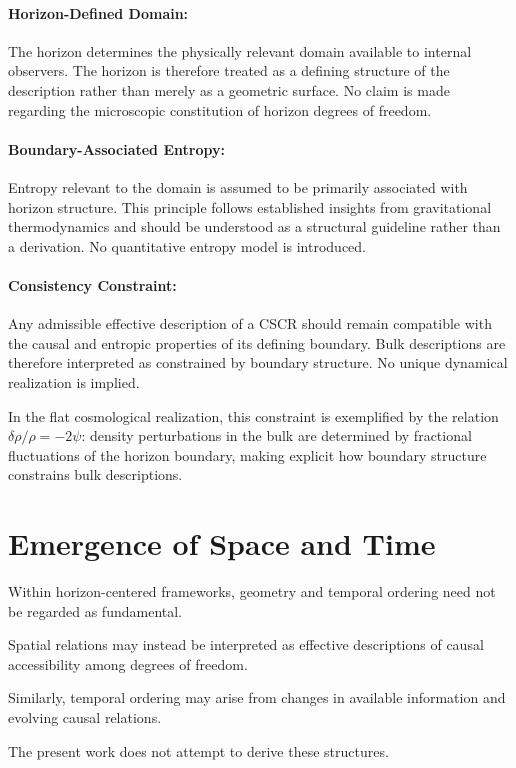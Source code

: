 \documentclass[12pt,a4paper]{article}
\begin{document}
\paragraph{Horizon-Defined Domain:} The horizon determines the physically relevant domain available to internal observers. The horizon is therefore treated as a defining structure of the description rather than merely as a geometric surface. No claim is made regarding the microscopic constitution of horizon degrees of freedom.

\paragraph{Boundary-Associated Entropy:} Entropy relevant to the domain is assumed to be primarily associated with horizon structure. This principle follows established insights from gravitational thermodynamics and should be understood as a structural guideline rather than a derivation. No quantitative entropy model is introduced.

\paragraph{Consistency Constraint:} Any admissible effective description of a CSCR should remain compatible with the causal and entropic properties of its defining boundary. Bulk descriptions are therefore interpreted as constrained by boundary structure. No unique dynamical realization is implied.

In the flat cosmological realization, this constraint is exemplified by the relation $\delta\rho/\rho = -2\psi$: density perturbations in the bulk are determined by fractional fluctuations of the horizon boundary, making explicit how boundary structure constrains bulk descriptions.

\section{Emergence of Space and Time}

Within horizon-centered frameworks, geometry and temporal ordering need not be regarded as fundamental.

Spatial relations may instead be interpreted as effective descriptions of causal accessibility among degrees of freedom.

Similarly, temporal ordering may arise from changes in available information and evolving causal relations.

The present work does not attempt to derive these structures.
\end{document}
